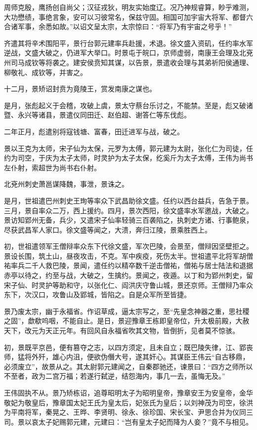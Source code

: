 \documentclass[12pt,UTF8]{ctexbook}
\begin{document}
周师克殷，鹰扬创自尚父；汉征戎狄，明友实始度辽。况乃神规睿算，眇乎难测，大功懋绩，事绝言象，安可以习彼常名，保兹守固。相国可加宇宙大将军、都督六合诸军事，余悉如故。”以诏文呈太宗，太宗惊曰：“将军乃有宇宙之号乎！”

齐遣其将辛术围阳平，景行台郭元建率兵赴援，术退。徐文盛入资矶，任约率水军逆战，文盛大破之，仍进军大举口。时景屯于皖口，京师虚弱，南康王会理及北兗州司马成钦等将袭之。建安侯贲知其谋，以告景，景遣收会理与其弟祈阳侯通理、柳敬礼、成钦等，并害之。

十二月，景矫诏封贲为竟陵王，赏发南康之谋也。

是月，张彪起义于会稽，攻破上虞，景太守蔡台乐讨之，不能禁。至是，彪又破诸暨、永兴等诸县，景遣仪同田迁、赵伯超、谢答仁等东伐彪。

二年正月，彪遣别将寇钱塘、富春，田迁进军与战，破之。

景以王克为太师，宋子仙为太保，元罗为太傅，郭元建为太尉，张化仁为司徒，任约为司空，于庆为太子太师，时灵护为太子太保，纥奚斤为太子太傅，王伟为尚书左仆射，索超世为尚书右仆射。

北兗州刺史萧邕谋降魏，事泄，景诛之。

是月，世祖遣巴州刺史王珣等率众下武昌助徐文盛。任约以西台益兵，告急于景。三月，景自率众二万，西上援约。四月，景次西阳，徐文盛率水军邀战，大破之。景访知郢州无备，兵少，又遣宋子仙率轻骑三百袭陷之，执刺史方诸、行事鲍泉，尽获武昌军人家口。徐文盛等闻之，大溃，奔归江陵，景乘胜西上。

初，世祖遣领军王僧辩率众东下代徐文盛，军次巴陵，会景至，僧辩因坚壁拒之。景设长围，筑土山，昼夜攻击，不克。军中疾疫，死伤太半。世祖遣平北将军胡僧祐率兵二千人救巴陵，景闻，遣任约以精卒数千逆击僧祐，僧祐与居士陆法和退据赤亭以待之，约至与战，大破之，生擒约。景闻之，夜遁。以丁和为郢州刺史，留宋子仙、时灵护等助和守，以张化仁、阎洪庆守鲁山城，景还京师。王僧辩乃率众东下，次汉口，攻鲁山及郢城，皆陷之。自是众军所至皆捷。

景乃废太宗，幽于永福省。作诏草成，逼太宗写之，至“先皇念神器之重，思社稷之固”，歔欷呜咽，不能自止。是日，景迎豫章王栋即皇帝位，升太极前殿，大赦天下，改元为天正元年。有回风自永福省吹其文物，皆倒折，见者莫不惊骇。

初，景既平京邑，便有篡夺之志，以四方须定，且未自立；既巴陵失律，江、郢丧师，猛将外歼，雄心内沮，便欲伪僭大号，遂其奸心。其谋臣王伟云“自古移鼎，必须废立”，故景从之。其太尉郭元建闻之，自秦郡驰还，谏景曰：“四方之师所以不至者，政为二宫万福；若遂行弑逆，结怨海内，事几一去，虽悔无及。”

王伟固执不从。景乃矫栋诏，追尊昭明太子为昭明皇帝，豫章安王为安皇帝，金华敬妃为敬皇后，豫章国太妃王氏为皇太后，妃张氏为皇后；以刘神茂为司空，徐洪为平南将军，秦晃之、王晔、李贤明、徐永、徐珍国、宋长宝、尹思合并为仪同三司。景以哀太子妃赐郭元建，元建曰：“岂有皇太子妃而降为人妾？”竟不与相见。
\end{document}
